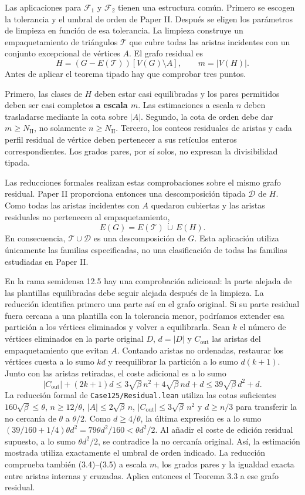\documentclass[spanish,11pt,a4paper]{article}
\begin{document}
Las aplicaciones para \(\mathcal F_1\) y \(\mathcal F_2\) tienen una estructura común. Primero se escogen la tolerancia y el umbral de orden de Paper II. Después se eligen los parámetros de limpieza en función de esa tolerancia. La limpieza construye un empaquetamiento de triángulos \(\mathcal T\) que cubre todas las aristas incidentes con un conjunto excepcional de vértices \(A\). El grafo residual es \[H=(G-E(\mathcal T))[V(G)\setminus A],\qquad m=|V(H)|.
\tag{3.6}\] Antes de aplicar el teorema tipado hay que comprobar tres puntos.

Primero, las clases de \(H\) deben estar casi equilibradas y los pares permitidos deben ser casi completos \textbf{a escala \(m\)}. Las estimaciones a escala \(n\) deben trasladarse mediante la cota sobre \(|A|\). Segundo, la cota de orden debe dar \(m\ge N_{\mathrm{II}}\), no solamente \(n\ge N_{\mathrm{II}}\). Tercero, los conteos residuales de aristas y cada perfil residual de vértice deben pertenecer a sus retículos enteros correspondientes. Los grados pares, por sí solos, no expresan la divisibilidad tipada.

Las reducciones formales realizan estas comprobaciones sobre el mismo grafo residual. Paper II proporciona entonces una descomposición tipada \(\mathcal D\) de \(H\). Como todas las aristas incidentes con \(A\) quedaron cubiertas y las aristas residuales no pertenecen al empaquetamiento, \[E(G)=E(\mathcal T)\,\dot\cup\,E(H).
\tag{3.7}\] En consecuencia, \(\mathcal T\cup\mathcal D\) es una descomposición de \(G\). Esta aplicación utiliza únicamente las familias especificadas, no una clasificación de todas las familias estudiadas en Paper II.

En la rama semidensa 12.5 hay una comprobación adicional: la parte alejada de las plantillas equilibradas debe seguir alejada después de la limpieza. La reducción identifica primero una parte así en el grafo original. Si su parte residual fuera cercana a una plantilla con la tolerancia menor, podríamos extender esa partición a los vértices eliminados y volver a equilibrarla. Sean \(k\) el número de vértices eliminados en la parte original \(D\), \(d=|D|\) y \(C_{\mathrm{out}}\) las aristas del empaquetamiento que evitan \(A\). Contando aristas no ordenadas, restaurar los vértices cuesta a lo sumo \(kd\) y reequilibrar la partición a lo sumo \(d(k+1)\). Junto con las aristas retiradas, el coste adicional es a lo sumo \[|C_{\mathrm{out}}|+(2k+1)d
\le 3\sqrt\beta\,n^2+4\sqrt\beta\,nd+d\le39\sqrt\beta\,d^2+d.\] La reducción formal de \texttt{Case125/\allowbreak{}Residual.\allowbreak{}lean} utiliza las cotas suficientes \(160\sqrt\beta\le\theta\), \(n\ge12/\theta\), \(|A|\le2\sqrt\beta\,n\), \(|C_{\mathrm{out}}|\le3\sqrt\beta\,n^2\) y \(d\ge n/3\) para transferir la no cercanía de \(\theta\) a \(\theta/2\). Como \(d\ge4/\theta\), la última expresión es a lo sumo \((39/160+1/4)\theta d^2=79\theta d^2/160<\theta d^2/2\). Al añadir el coste de edición residual supuesto, a lo sumo \(\theta d^2/2\), se contradice la no cercanía original. Así, la estimación mostrada utiliza exactamente el umbral de orden indicado. La reducción comprueba también (3.4)--(3.5) a escala \(m\), los grados pares y la igualdad exacta entre aristas internas y cruzadas. Aplica entonces el Teorema 3.3 a ese grafo residual.
\end{document}
